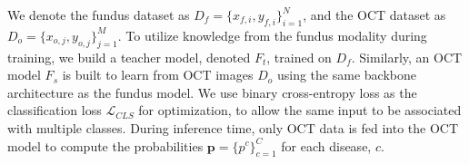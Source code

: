 \documentclass[runningheads]{llncs}
\newcommand{\wdai}[1]{{\color[rgb]{0.9,0.1,0.1}{#1}}}
\begin{document}
We denote the fundus dataset as $D_f = \{x_{f,i}, y_{f,i}\}_{i=1}^N$, and the OCT dataset as  $D_o = \{x_{o,j}, y_{o,j}\}_{j=1}^M$. To utilize knowledge from the fundus modality during training, we build a teacher model, denoted $F_t$, trained on $D_f$. Similarly, an OCT model $F_s$ is built to learn from OCT images $D_o$ using the same backbone architecture as the fundus model. We use binary cross-entropy loss as the classification loss $\mathcal{L}_{CLS}$ for optimization, to allow the same input to be associated with multiple classes. During inference time, only OCT data is fed into the OCT model to compute the probabilities $\boldsymbol{p}=\{p^c\}_{c=1}^C$ for each disease, $c$. 




\end{document}

